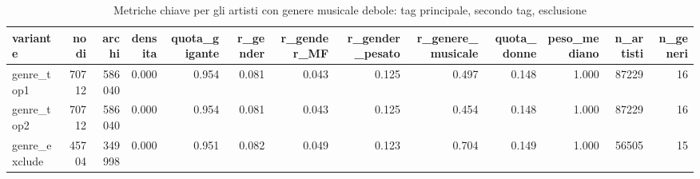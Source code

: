 \begin{table}
\centering
\caption{Metriche chiave per gli artisti con genere musicale debole: tag principale, secondo tag, esclusione}
\label{tab:t5_genere_debole}
\begin{tabular}{lrrrrrrrrrrrr}
\toprule
     variante &  nodi &  archi &  densita &  quota\_gigante &  r\_gender &  r\_gender\_MF &  r\_gender\_pesato &  r\_genere\_musicale &  quota\_donne &  peso\_mediano &  n\_artisti &  n\_generi \\
\midrule
   genre\_top1 & 70712 & 586040 &    0.000 &          0.954 &     0.081 &        0.043 &            0.125 &              0.497 &        0.148 &         1.000 &      87229 &        16 \\
   genre\_top2 & 70712 & 586040 &    0.000 &          0.954 &     0.081 &        0.043 &            0.125 &              0.454 &        0.148 &         1.000 &      87229 &        16 \\
genre\_exclude & 45704 & 349998 &    0.000 &          0.951 &     0.082 &        0.049 &            0.123 &              0.704 &        0.149 &         1.000 &      56505 &        15 \\
\bottomrule
\end{tabular}
\end{table}
